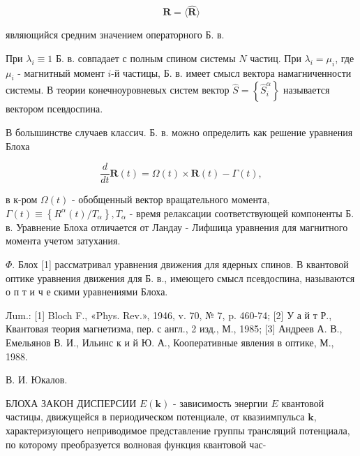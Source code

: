 \documentclass[10pt]{article}
\begin{document}
\[

\boldsymbol{R}=\langle\hat{\boldsymbol{R}}\rangle

\]



являющийся средним значением операторного Б. в.



При $\lambda_{i} \equiv 1$ Б. в. совпадает с полным спином системы $N$ частиц. При $\lambda_{i}=\mu_{i}$, где $\mu_{i}$ - магнитный момент $i$-й частицы, Б. в. имеет смысл вектора намагниченности системы. В теории конечноуровневых систем вектор $\hat{S}=\left\{\hat{S}_{i}^{\alpha}\right\}$ называется вектором псевдоспина.



В болышинстве случаев классич. Б. в. можно определить как решение уравнения Блоха



\[

\frac{d}{d t} \boldsymbol{R}(t)=\Omega(t) \times \boldsymbol{R}(t)-\Gamma(t),

\]



в к-ром $\Omega(t)$ - обобщенный вектор вращательного момента, $\Gamma(t) \equiv\left\{R^{\alpha}(t) / T_{\alpha}\right\}, T_{\alpha}$ - время релаксации соответствующей компоненты Б. в. Уравнение Блоха отличается от Ландау - Лифшица уравнения для магнитного момента учетом затухания.



$\Phi$. Блох [1] рассматривал уравнения движения для ядерных спинов. В квантовой оптике уравнения движения для Б. в., имеющего смысл псевдоспина, называются о п т и ч е скими уравнениями Блоха.



Лum.: [1] Bloch F., «Phys. Rev.», 1946, v. 70, № 7, p. 460-74; [2] У а й т Р., Квантовая теория магнетизма, пер. с англ., 2 изд., М., 1985; [3] Андреев А. В., Емельянов В. И., Ильинс к и й Ю. А., Кооперативные явления в оптике, М., 1988.



В. И. Юкалов.



БЛОХА ЗАКОН ДИСПЕРСИИ $E(\boldsymbol{k})$ - зависимость энергии $E$ квантовой частицы, движущейся в периодическом потенциале, от квазиимпульса $\boldsymbol{k}$, характеризующего неприводимое представление группы трансляций потенциала, по которому преобразуется волновая функция квантовой час-
\end{document}
